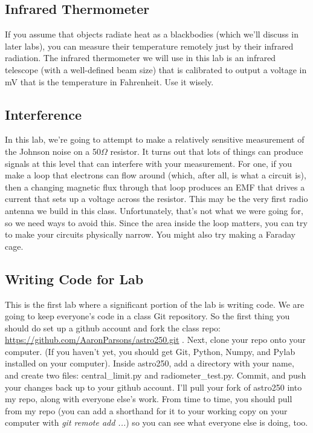 \documentclass[11pt]{article}
\begin{document}
\subsection*{Infrared Thermometer}

If you assume that objects radiate heat as a blackbodies (which we'll discuss in later labs), you
can measure their temperature remotely just by their infrared radiation.  The infrared thermometer
we will use in this lab is an infrared telescope (with a well-defined beam size) that is
calibrated to output a voltage in mV that is the temperature in Fahrenheit.  Use it wisely.

\subsection*{Interference}

In this lab, we're going to attempt to make a relatively sensitive measurement of the Johnson
noise on a 50$\Omega$ resistor.  It turns out that lots of things can produce signals at this 
level that can interfere with your measurement.  For one, if you make a loop that electrons can
flow around (which, after all, is what a circuit is), then a changing magnetic flux through that
loop produces an EMF that drives a current that sets up a voltage across the resistor.  This may
be the very first radio antenna we build in this class.  Unfortunately, that's not what we were
going for, so we need ways to avoid this.  Since the area inside the loop matters, you can try to
make your circuits physically narrow.  You might also try making a Faraday cage.

\subsection*{Writing Code for Lab}

This is the first lab where a significant portion of the lab is writing code.  We are going to keep
everyone's code in a class Git repository.  So the first thing you should do set up a github
account and fork the class repo: \url{https://github.com/AaronParsons/astro250.git} .
Next, clone your repo onto your computer.  (If you haven't yet, you should get Git, Python, Numpy,
and Pylab installed on your computer).  Inside astro250, add a directory with your name, and create
two files: central\_limit.py and radiometer\_test.py.  Commit, and push your changes back up to
your github account.  I'll pull your fork of astro250 into
my repo, along with everyone else's work.  From time to time, you should pull from my repo (you
can add a shorthand for it to your working copy on your computer with {\it git remote add ...})
so you can see what everyone else is doing, too.
\end{document}
